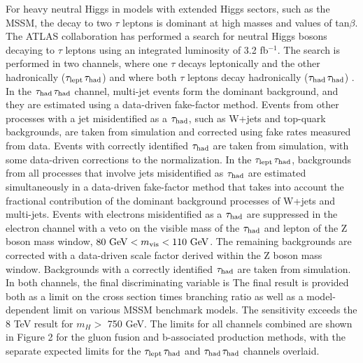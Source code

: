 For heavy neutral Higgs in models with extended Higgs sectors, such as the MSSM, the decay
to two $\tau$ leptons is dominant at high masses and values of tan$\beta$. The ATLAS collaboration has
performed a search for neutral Higgs bosons decaying to $\tau$ leptons using an integrated luminosity
of 3.2 fb$^{−1}$. The search is performed in two channels, where one $\tau$ decays leptonically and the
other hadronically ($\tau_{\rm lept}$$\tau_{\rm had}$) and where both $\tau$ leptons decay hadronically ($\tau_{\rm had}$$\tau_{\rm had}$) .
In the $\tau_{\rm had}$$\tau_{\rm had}$ channel, multi-jet events form the dominant background, and they are estimated
using a data-driven fake-factor method. Events from other processes with a jet misidentified
as a $\tau_{\rm had}$, such as W+jets and top-quark backgrounds, are taken from simulation and
corrected using fake rates measured from data. Events with correctly identified $\tau_{\rm had}$ are taken
from simulation, with some data-driven corrections to the normalization.
In the $\tau_{\rm lept}$$\tau_{\rm had}$, backgrounds from all processes that involve jets misidentified as $\tau_{\rm had}$
are estimated simultaneously in a data-driven fake-factor method that takes into account the
fractional contribution of the dominant background processes of W+jets and multi-jets. Events
with electrons misidentified as a $\tau_{\rm had}$ are suppressed in the electron channel with a veto on the
visible mass of the $\tau_{\rm had}$ and lepton of the Z boson mass window, $80~{\rm GeV} < m_{\rm vis} < 110~{\rm GeV}$.
The remaining backgrounds are corrected with a data-driven scale factor derived within the Z boson mass window. Backgrounds with a correctly identified $\tau_{\rm had}$ are taken from simulation.
In both channels, the final discriminating variable is 
The final result is provided both as a limit on the cross section times branching ratio as well
as a model-dependent limit on various MSSM benchmark models. The sensitivity exceeds the
8 TeV result for $m_{H} >$ 750 GeV. The limits for all channels combined are shown in Figure 2
for the gluon fusion and b-associated production methods, with the separate expected limits for
the $\tau_{\rm lept}$$\tau_{\rm had}$ and $\tau_{\rm had}$$\tau_{\rm had}$ channels overlaid.